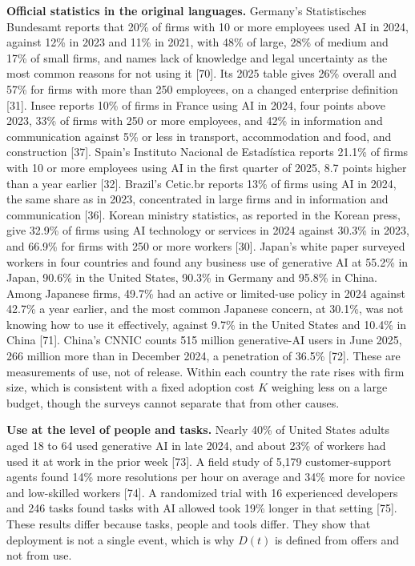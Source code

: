 \documentclass[10pt,letterpaper]{article}
\begin{document}
\textbf{Official statistics in the original languages.} Germany's
Statistisches Bundesamt reports that 20\% of firms with 10 or more
employees used AI in 2024, against 12\% in 2023 and 11\% in 2021, with
48\% of large, 28\% of medium and 17\% of small firms, and names lack of
knowledge and legal uncertainty as the most common reasons for not using
it {[}70{]}. Its 2025 table gives 26\% overall and 57\% for firms with
more than 250 employees, on a changed enterprise definition {[}31{]}.
Insee reports 10\% of firms in France using AI in 2024, four points
above 2023, 33\% of firms with 250 or more employees, and 42\% in
information and communication against 5\% or less in transport,
accommodation and food, and construction {[}37{]}. Spain's Instituto
Nacional de Estadística reports 21.1\% of firms with 10 or more
employees using AI in the first quarter of 2025, 8.7 points higher than
a year earlier {[}32{]}. Brazil's Cetic.br reports 13\% of firms using
AI in 2024, the same share as in 2023, concentrated in large firms and
in information and communication {[}36{]}. Korean ministry statistics,
as reported in the Korean press, give 32.9\% of firms using AI
technology or services in 2024 against 30.3\% in 2023, and 66.9\% for
firms with 250 or more workers {[}30{]}. Japan's white paper surveyed
workers in four countries and found any business use of generative AI at
55.2\% in Japan, 90.6\% in the United States, 90.3\% in Germany and
95.8\% in China. Among Japanese firms, 49.7\% had an active or
limited-use policy in 2024 against 42.7\% a year earlier, and the most
common Japanese concern, at 30.1\%, was not knowing how to use it
effectively, against 9.7\% in the United States and 10.4\% in China
{[}71{]}. China's CNNIC counts 515 million generative-AI users in June
2025, 266 million more than in December 2024, a penetration of 36.5\%
{[}72{]}. These are measurements of use, not of release. Within each
country the rate rises with firm size, which is consistent with a fixed
adoption cost \(K\) weighing less on a large budget, though the surveys
cannot separate that from other causes.

\textbf{Use at the level of people and tasks.} Nearly 40\% of United
States adults aged 18 to 64 used generative AI in late 2024, and about
23\% of workers had used it at work in the prior week {[}73{]}. A field
study of 5,179 customer-support agents found 14\% more resolutions per
hour on average and 34\% more for novice and low-skilled workers
{[}74{]}. A randomized trial with 16 experienced developers and 246
tasks found tasks with AI allowed took 19\% longer in that setting
{[}75{]}. These results differ because tasks, people and tools differ.
They show that deployment is not a single event, which is why \(D(t)\)
is defined from offers and not from use.
\end{document}
